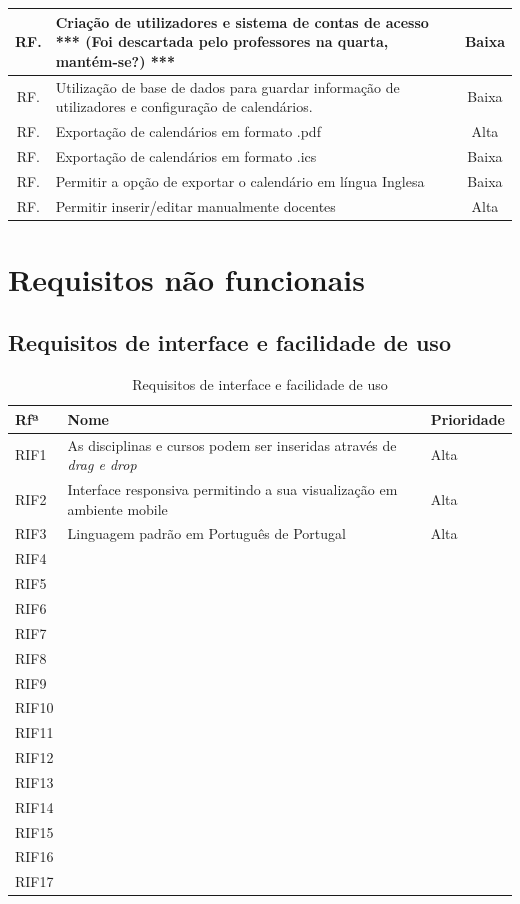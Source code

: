 \documentclass[11pt, twoside]{report}
\begin{document}
\begin{center}
\begin{tabularx}{\textwidth}{|c|X|c|}
				\hline
				RF. & Criação de utilizadores e sistema de contas de acesso *** (Foi descartada pelo professores na quarta, mantém-se?) *** & Baixa \\
				\hline
				RF. & Utilização de base de dados para guardar informação de utilizadores e configuração de calendários. & Baixa \\
				\hline
				RF. & Exportação de calendários em formato .pdf & Alta \\
				\hline
				RF. & Exportação de calendários em formato .ics & Baixa \\
				\hline
				RF. & Permitir a opção de exportar o calendário em língua Inglesa & Baixa \\
				\hline
				RF. & Permitir inserir/editar manualmente docentes & Alta \\
				\hline
			\end{tabularx}

	\end{center}

	
	\section{Requisitos não funcionais}
	\subsection{Requisitos de interface e facilidade de uso}
		\begin{table}[H]
		\centering
		\caption{Requisitos de interface e facilidade de uso}	
		\vspace{0.5cm}
		\begin{tabular}{|l|l|l|}
			\hline
			Rfª & Nome & Prioridade\\
			\hline
			RIF1 & As disciplinas e cursos podem ser inseridas através de \textit{drag e drop} &Alta\\
			\hline
			RIF2 & Interface responsiva permitindo a sua visualização em ambiente mobile &Alta\\
			\hline
			RIF3 & Linguagem padrão em Português de Portugal &Alta\\
			\hline
			RIF4 &&\\
			\hline
			RIF5 &&\\
			\hline
			RIF6&&\\
			\hline
			RIF7& & \\
			\hline
			RIF8& & \\
			\hline
			RIF9& &\\
			\hline
			RIF10&&\\
			\hline
			RIF11&&\\
			\hline
			RIF12& &\\
			\hline
			RIF13&&\\
			\hline
			RIF14&&\\
			\hline
			RIF15&&\\
			\hline
			RIF16&&\\
			\hline
			RIF17&&\\
			\hline
		\end{tabular}
		\label{requisitosdeinterface}
	\end{table}
\end{document}
